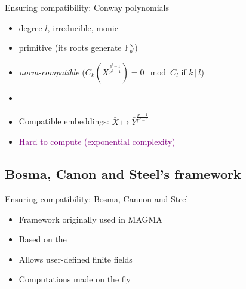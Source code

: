 \documentclass[xcolor=x11names,compress, aspectratio=43]{beamer}
\begin{document}
\begin{frame}{Ensuring compatibility: Conway polynomials}
  \begin{defi}
    \begin{itemize}
      \item degree $l$, irreducible, monic
      \item primitive (\ie its roots generate $\mathbb{F}_{p^l}^\times$)
      \item \emph{norm-compatible} (\ie $C_k\left( X^{\frac{p^l-1}{p^k-1}}
        \right) = 0 \mod C_l$ if $k\,|\,l$)
    \end{itemize}
  \end{defi}
  \begin{itemize}
    \item<2-> 
    \item<3-> Compatible embeddings: $\bar{X}\mapsto
      \bar{Y}^{\frac{p^l-1}{p^k-1}}$\hspace{10mm}
    \item<4-> \textcolor{purple}{Hard to compute (exponential complexity)}
  \end{itemize}
\end{frame}
\subsection{Bosma, Canon and Steel's framework}
\begin{frame}{Ensuring compatibility: Bosma, Cannon and Steel}
  \begin{itemize}
    \item Framework originally used in MAGMA
    \item Based on the 
    \item Allows user-defined finite fields
    \item Computations made on the fly
  \end{itemize}
\end{frame}
\end{document}
